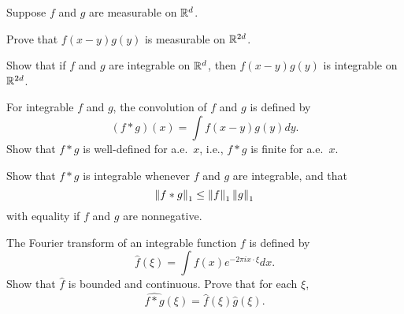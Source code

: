 \begin{exercise}
    Suppose $f$ and $g$ are measurable on $\mathbb{R}^d$. 
    \begin{thmenum}
        \item Prove that $f(x-y)g(y)$ is measurable on $\mathbb{R}^{2d}$. 
        \item Show that if $f$ and $g$ are integrable on $\mathbb{R}^d$, then $f(x-y)g(y)$ 
        is integrable on $\mathbb{R}^{2d}$. 
        \item For integrable $f$ and $g$, the convolution of $f$ and $g$ is defined by 
        \begin{equation*}
            (f*g)(x) = \int f(x-y)g(y)dy.
        \end{equation*}
        Show that $f*g$ is well-defined for a.e.\ $x$, i.e., $f*g$ is finite for 
        a.e.\ $x$. 
        \item Show that $f*g$ is integrable whenever $f$ and $g$ are integrable, 
        and that 
        \begin{equation*}
            \left\lVert {f*g} \right\rVert_1 \leq \left\lVert {f} \right\rVert_1\left\lVert {g} \right\rVert_1
        \end{equation*}
        with equality if $f$ and $g$ are nonnegative. 
        \item The Fourier transform of an integrable function $f$ is defined by 
        \begin{equation*}
            \hat{f}(\xi) = \int f(x)e^{-2\pi i x\cdot\xi}dx.
        \end{equation*}
        Show that $\hat{f}$ is bounded and continuous. Prove that for each $\xi$, 
        \begin{equation*}
            \widehat{f*g}(\xi) = \hat{f}(\xi)\hat{g}(\xi).
        \end{equation*}
    \end{thmenum}
\end{exercise}
